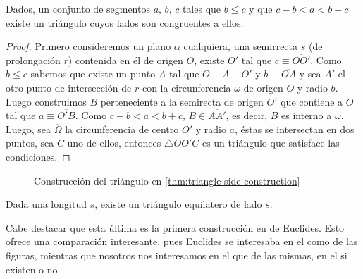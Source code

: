 \documentclass[11pt,a4paper]{book}
\begin{document}
\begin{thm}\label{thm:triangle-side-construction}
Dados, un conjunto de segmentos $a,\,b,\,c$ tales que $b\leq c$ y que $c-b\lt a\lt b+c$ existe un triángulo cuyos lados son congruentes a ellos.
\end{thm}
\begin{proof}
Primero consideremos un plano $\alpha$ cualquiera, una semirrecta $s$ (de prolongación $r$) contenida en él de origen $O$, existe $O'$ tal que $c\equiv\overline{OO'}$. Como $b\leq c$ sabemos que existe un punto $A$ tal que $O-A-O'$ y $b\equiv\overline{OA}$ y sea $A'$ el otro punto de intersección de $r$ con la circunferencia $\overline{\omega}$ de origen $O$ y radio $b$. Luego construimos $B$ perteneciente a la semirecta de origen $O'$ que contiene a $O$ tal que $a\equiv\overline{O'B}$. Como $c-b\lt a\lt b+c$, $B\in \overline{AA'}$, es decir, $B$ es interno a $\omega$. Luego, sea $\overline{\Omega}$ la circunferencia de centro $O'$ y radio $a$, éstas se intersectan en dos puntos, sea $C$ uno de ellos, entonces $\triangle OO'C$ es un triángulo que satisface las condiciones.
\end{proof}
\begin{figure}
\centering
{}
\caption{Construcción del triángulo en \ref{thm:triangle-side-construction}}
\end{figure}
\begin{cor}
Dada una longitud $s$, existe un triángulo equilatero de lado $s$.
\end{cor}
Cabe destacar que esta última es la primera construcción en  de Euclides. Esto ofrece una comparación interesante, pues Euclides se interesaba en el como de las figuras, mientras que nosotros nos interesamos en el que de las mismas, en el si existen o no.
\end{document}

